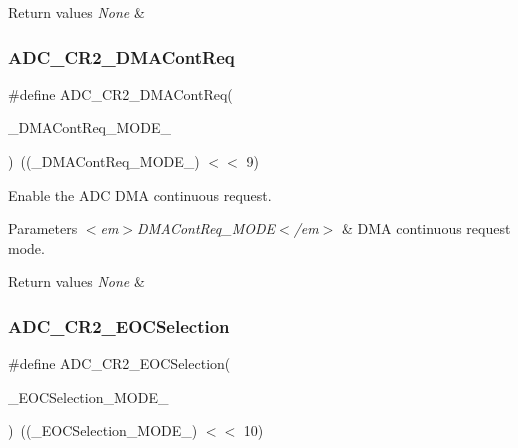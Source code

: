 \begin{DoxyRetVals}{Return values}
{\em None} & \\
\hline
\end{DoxyRetVals}
\mbox{\label{group___a_d_c___private___macros_ga93bf2d0e4b9f98b83ee48be918e9c940}} 
\subsubsection{\texorpdfstring{ADC\_CR2\_DMAContReq}{ADC\_CR2\_DMAContReq}}
{\footnotesize\ttfamily \#define A\+D\+C\+\_\+\+C\+R2\+\_\+\+D\+M\+A\+Cont\+Req(\begin{DoxyParamCaption}\item[{}]{\+\_\+\+D\+M\+A\+Cont\+Req\+\_\+\+M\+O\+D\+E\+\_\+ }\end{DoxyParamCaption})~((\+\_\+\+D\+M\+A\+Cont\+Req\+\_\+\+M\+O\+D\+E\+\_\+) $<$$<$ 9)}



Enable the A\+DC D\+MA continuous request. 


\begin{DoxyParams}{Parameters}
{\em $<$em$>$\+D\+M\+A\+Cont\+Req\+\_\+\+M\+O\+D\+E$<$/em$>$} & D\+MA continuous request mode. \\
\hline
\end{DoxyParams}

\begin{DoxyRetVals}{Return values}
{\em None} & \\
\hline
\end{DoxyRetVals}
\mbox{\label{group___a_d_c___private___macros_gaa6514c197b4d16b3d08938cdad573ef5}} 
\subsubsection{\texorpdfstring{ADC\_CR2\_EOCSelection}{ADC\_CR2\_EOCSelection}}
{\footnotesize\ttfamily \#define A\+D\+C\+\_\+\+C\+R2\+\_\+\+E\+O\+C\+Selection(\begin{DoxyParamCaption}\item[{}]{\+\_\+\+E\+O\+C\+Selection\+\_\+\+M\+O\+D\+E\+\_\+ }\end{DoxyParamCaption})~((\+\_\+\+E\+O\+C\+Selection\+\_\+\+M\+O\+D\+E\+\_\+) $<$$<$ 10)}



